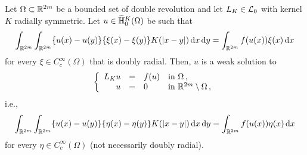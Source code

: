 \begin{proposition}
	\label{Prop:WeakSolutionForAllTestFunctions}
	Let $\Omega \subset \mathbb{R}^{2m}$ be a bounded set of double revolution and let $L_K \in \mathcal{L}_0$ with kernel $K$ radially symmetric. Let $u\in \widetilde{\mathbb{H}}^K_{0}(\Omega)$ be such that
	$$
	\int_{\mathbb{R}^{2m}}\int_{\mathbb{R}^{2m}} \{u(x)-u(y)\}\{\xi(x)-\xi(y)\} K(|x-y|) \,\mathrm{d} x \,\mathrm{d} y = \int_{\mathbb{R}^{2m}} f(u(x)) \xi(x) \,\mathrm{d} x
	$$
	for every $\xi \in C^\infty_c(\Omega)$ that is doubly radial. Then, $u$ is a weak solution to
	$$
	\left\{\begin{array}{rcll}
	L_K u &=& f(u) & \text{in } \Omega\,,\\
	u &=& 0 & \text{in } \mathbb{R}^{2m}\setminus \Omega\,,
	\end{array} \right.
	$$
	i.e.,
	$$
	\int_{\mathbb{R}^{2m}}\int_{\mathbb{R}^{2m}} \{u(x)-u(y)\}\{\eta(x)-\eta(y)\} K(|x-y|) \,\mathrm{d} x \,\mathrm{d} y = \int_{\mathbb{R}^{2m}} f(u(x)) \eta(x) \,\mathrm{d} x
	$$
	for every $\eta \in C^\infty_c(\Omega)$ (not necessarily doubly radial).
\end{proposition}

